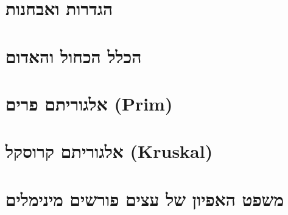 \documentclass[]{article}
\begin{document}
	


\section*{הגדרות ואבחנות}
\section*{%
הכלל הכחול והאדום%
}
\section*{אלגוריתם פרים
(\textenglish{Prim})
}
\section*{אלגוריתם קרוסקל
(\textenglish{Kruskal})
}
\section*{משפט האפיון של עצים פורשים מינימלים}
\end{document}
